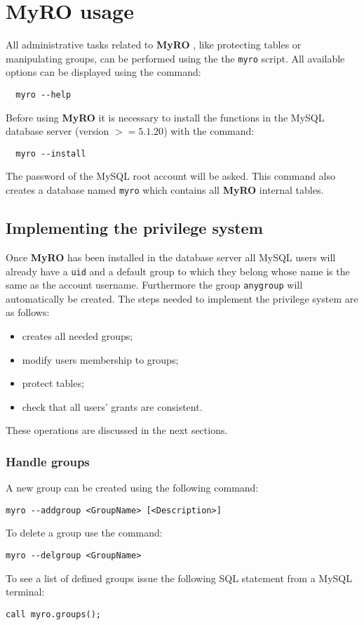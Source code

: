 \documentclass[12pt,titlepage]{article}
\newcommand{\myro}{\textbf{MyRO} }
\begin{document}
\newpage
\section{\myro usage}
All administrative tasks related to \myro, like protecting tables or
manipulating groups, can be performed using the the \verb|myro|
script. All available options can be displayed using the command:
%
\begin{verbatim}
  myro --help
\end{verbatim}
%
Before using \myro it is necessary to install the functions in the
MySQL database server (version $>= 5.1.20$) with the command:
%
\begin{verbatim}
  myro --install
\end{verbatim}
%
The password of the MySQL root account will be asked. This command
also creates a database named \verb|myro| which contains all \myro
internal tables.

%
\subsection{Implementing the privilege system}
Once \myro has been installed in the database server all MySQL users
will already have a \verb|uid| and a default group to which they
belong whose name is the same as the account username. Furthermore
the group \verb|anygroup| will automatically be created. The steps
needed to implement the privilege system are as follows:
%
\begin{itemize}
\item creates all needed groups;
\item modify users membership to groups;
\item protect tables;
\item check that all users' grants are consistent.
\end{itemize}
%
These operations are discussed in the next sections.

%
\subsubsection{Handle groups}
A new group can be created using the following command:
%
\begin{verbatim}
myro --addgroup <GroupName> [<Description>]
\end{verbatim}
%
To delete a group use the command:
%
\begin{verbatim}
myro --delgroup <GroupName>
\end{verbatim}
%
To see a list of defined groups issue the following SQL statement from
a MySQL terminal:
%
\begin{verbatim}
call myro.groups();
\end{verbatim}
\end{document}
